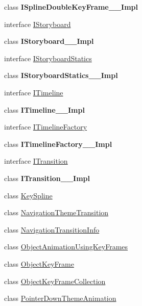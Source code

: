 \begin{DoxyCompactItemize}
\item 
class {\bfseries I\+Spline\+Double\+Key\+Frame\+\_\+\+\_\+\+Impl}
\item 
interface \hyperlink{interface_windows_1_1_u_i_1_1_xaml_1_1_media_1_1_animation_1_1_i_storyboard}{I\+Storyboard}
\item 
class {\bfseries I\+Storyboard\+\_\+\+\_\+\+Impl}
\item 
interface \hyperlink{interface_windows_1_1_u_i_1_1_xaml_1_1_media_1_1_animation_1_1_i_storyboard_statics}{I\+Storyboard\+Statics}
\item 
class {\bfseries I\+Storyboard\+Statics\+\_\+\+\_\+\+Impl}
\item 
interface \hyperlink{interface_windows_1_1_u_i_1_1_xaml_1_1_media_1_1_animation_1_1_i_timeline}{I\+Timeline}
\item 
class {\bfseries I\+Timeline\+\_\+\+\_\+\+Impl}
\item 
interface \hyperlink{interface_windows_1_1_u_i_1_1_xaml_1_1_media_1_1_animation_1_1_i_timeline_factory}{I\+Timeline\+Factory}
\item 
class {\bfseries I\+Timeline\+Factory\+\_\+\+\_\+\+Impl}
\item 
interface \hyperlink{interface_windows_1_1_u_i_1_1_xaml_1_1_media_1_1_animation_1_1_i_transition}{I\+Transition}
\item 
class {\bfseries I\+Transition\+\_\+\+\_\+\+Impl}
\item 
class \hyperlink{class_windows_1_1_u_i_1_1_xaml_1_1_media_1_1_animation_1_1_key_spline}{Key\+Spline}
\item 
class \hyperlink{class_windows_1_1_u_i_1_1_xaml_1_1_media_1_1_animation_1_1_navigation_theme_transition}{Navigation\+Theme\+Transition}
\item 
class \hyperlink{class_windows_1_1_u_i_1_1_xaml_1_1_media_1_1_animation_1_1_navigation_transition_info}{Navigation\+Transition\+Info}
\item 
class \hyperlink{class_windows_1_1_u_i_1_1_xaml_1_1_media_1_1_animation_1_1_object_animation_using_key_frames}{Object\+Animation\+Using\+Key\+Frames}
\item 
class \hyperlink{class_windows_1_1_u_i_1_1_xaml_1_1_media_1_1_animation_1_1_object_key_frame}{Object\+Key\+Frame}
\item 
class \hyperlink{class_windows_1_1_u_i_1_1_xaml_1_1_media_1_1_animation_1_1_object_key_frame_collection}{Object\+Key\+Frame\+Collection}
\item 
class \hyperlink{class_windows_1_1_u_i_1_1_xaml_1_1_media_1_1_animation_1_1_pointer_down_theme_animation}{Pointer\+Down\+Theme\+Animation}

\end{DoxyCompactItemize}
